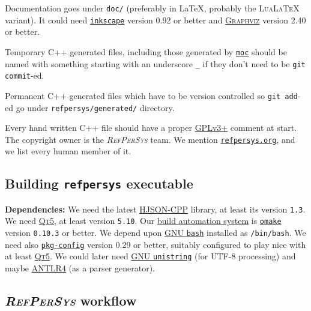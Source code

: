 \documentclass[11pt,a4paper,svgnames]{article}
\newcommand{\RefPerSys}{{\textit{\textsc{RefPerSys}}}}
\begin{document}
Documentation goes under \texttt{doc/} (preferably in \LaTeX, probably
the \textsc{LuaLaTeX} variant). It could need
\href{https://inkscape.org/}{\texttt{inkscape}} version 0.92 or better and
\href{https://www.graphviz.org/}{\textsc{Graphviz}} version 2.40 or
better.

Temporary C++ generated files, including those generated by
\href{https://doc.qt.io/qt-5/moc.html}{\texttt{moc}} should be named
with something starting with an underscore \texttt{\_} if they don't
need to be \texttt{git commit}-ed.

Permanent C++ generated files which have to be version controlled so
\texttt{git add}-ed go under \texttt{refpersys/generated/} directory.

Every hand written C++ file should have a proper
\href{https://www.gnu.org/licenses/gpl-3.0.en.html}{GPLv3+} comment at
start.  The copyright owner is the {\RefPerSys} team. We mention
\href{http://refpersys.org/}{\texttt{refpersys.org}}, and we list
every human member of it.

\subsection{Building \texttt{refpersys} executable}
\label{subsec:building}

\textbf{Dependencies:} We need the latest
\href{https://github.com/hjson/hjson-cpp}{HJSON-CPP} library, at least
its version \texttt{1.3}.  We need \href{http://qt.io}{\textsc{Qt5}},
  at least version \texttt{5.10}. Our
  \href{https://en.wikipedia.org/wiki/Build_automation}{build
    automation system} is
  \href{http://projects.camlcity.org/projects/omake.html}{\texttt{omake}}
  version \texttt{0.10.3} or better.  We depend upon
  \href{https://www.gnu.org/software/bash/}{GNU \texttt{bash}}
  installed as \texttt{/bin/bash}.  We need also
  \href{https://www.freedesktop.org/wiki/Software/pkg-config/}{\texttt{pkg-config}}
  version 0.29 or better, suitably configured to play nice with at
  least \href{http://qt.io}{\textsc{Qt5}}.  We could later need
    \href{https://www.gnu.org/software/libunistring/}{GNU
      \texttt{unistring}} (for UTF-8 processing) and maybe
    \href{https://www.antlr.org/}{ANTLR4} (as a parser generator).

\subsection{{\RefPerSys} workflow}
\label{subsec:workflow}
\end{document}
